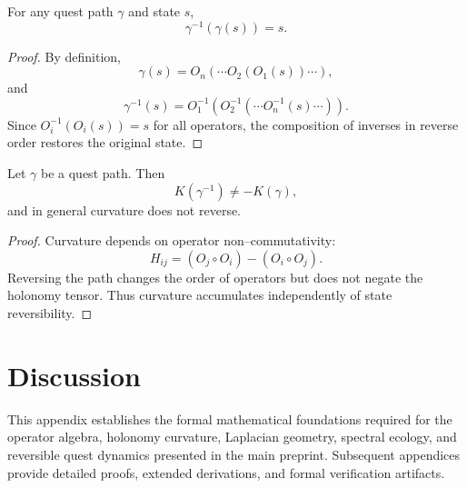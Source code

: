 \begin{theorem}
For any quest path $\gamma$ and state $s$,
\[
\gamma^{-1}(\gamma(s)) = s.
\]
\end{theorem}

\begin{proof}
By definition,
\[
\gamma(s) = O_n(\cdots O_2(O_1(s))\cdots),
\]
and
\[
\gamma^{-1}(s) = O_1^{-1}(O_2^{-1}(\cdots O_n^{-1}(s)\cdots)).
\]
Since $O_i^{-1}(O_i(s)) = s$ for all operators, the composition of
inverses in reverse order restores the original state.
\end{proof}

\begin{theorem}
Let $\gamma$ be a quest path. Then
\[
K(\gamma^{-1}) \neq -K(\gamma),
\]
and in general curvature does not reverse.
\end{theorem}

\begin{proof}
Curvature depends on operator non–commutativity:
\[
H_{ij} = (O_j \circ O_i) - (O_i \circ O_j).
\]
Reversing the path changes the order of operators but does not negate
the holonomy tensor. Thus curvature accumulates independently of state
reversibility.
\end{proof}

\section{Discussion}
This appendix establishes the formal mathematical foundations required
for the operator algebra, holonomy curvature, Laplacian geometry,
spectral ecology, and reversible quest dynamics presented in the main
preprint. Subsequent appendices provide detailed proofs, extended
derivations, and formal verification artifacts.
